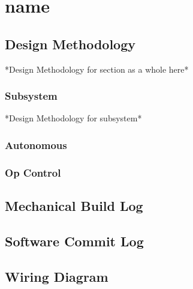 \begingroup %
\renewcommand\thechapter{\#} %

\chapter[name]{name}

\section[Iteration \# Design Methodology]{Design Methodology}
*Design Methodology for section as a whole here*
\subsection[Iteration \# INSERT_SUBSECTION]{Subsystem}
*Design Methodology for subsystem*
\subsection[Iteration \# Autonomous]{Autonomous}
\subsection[Iteration \# Op Control]{Op Control}
\section[Iteration \# Mechanical Subsystems]{Mechanical Build Log}


\section[Iteration \# Code]{Software Commit Log}



\section[Iteration \# Wiring Diagram]{Wiring Diagram}

\endgroup %
